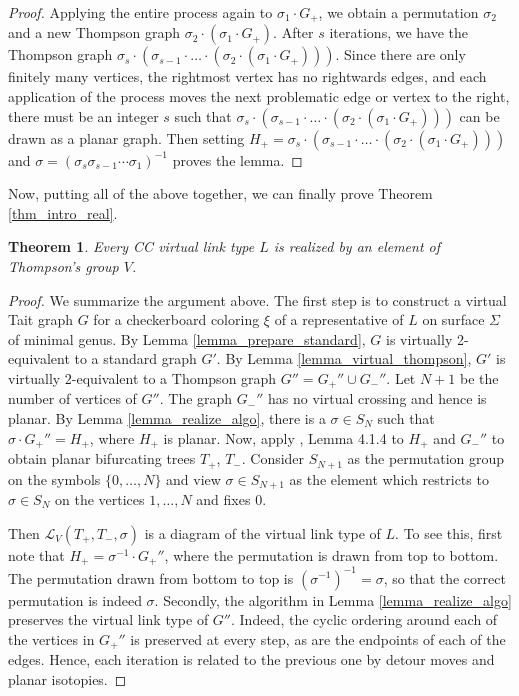 \documentclass[11pt, twoside]{amsart}
\numberwithin{equation}{section}
\newtheorem{theorem}{Theorem}[subsection]
\theoremstyle{definition}
\numberwithin{equation}{section}
\begin{document}
\begin{proof}
Applying the entire process again to $\sigma_1 \cdot G_+$, we obtain a permutation $\sigma_2$ and a new Thompson graph $\sigma_2 \cdot (\sigma_1 \cdot G_+)$. After $s$ iterations, we have the Thompson graph $\sigma_s \cdot (\sigma_{s-1} \cdot \ldots\cdot(\sigma_2 \cdot (\sigma_1 \cdot G_+)))$. Since there are only finitely many vertices, the rightmost vertex has no rightwards edges, and each application of the process moves the next problematic edge or vertex to the right, there must be an integer $s$ such that $\sigma_s \cdot (\sigma_{s-1} \cdot \ldots\cdot(\sigma_2 \cdot (\sigma_1 \cdot G_+)))$ can be drawn as a planar graph. Then setting $H_+=\sigma_s \cdot (\sigma_{s-1} \cdot \ldots\cdot(\sigma_2 \cdot (\sigma_1 \cdot G_+)))$ and $\sigma= (\sigma_s\sigma_{s-1} \cdots \sigma_1)^{-1}$ proves the lemma.
\end{proof}

Now, putting all of the above together, we can finally prove Theorem \ref{thm_intro_real}.

\begin{theorem}\label{thm: realization} Every CC virtual link type $L$ is realized by an element of Thompson's group $V$.
\end{theorem}
\begin{proof} We summarize the argument above. The first step is to construct a virtual Tait graph $G$ for a checkerboard coloring $\xi$ of a representative of $L$ on surface $\Sigma$ of minimal genus. By Lemma \ref{lemma_prepare_standard}, $G$ is virtually 2-equivalent to a standard graph $G'$. By Lemma \ref{lemma_virtual_thompson}, $G'$ is virtually $2$-equivalent to a Thompson graph $G''=G_+'' \cup G_-''$. Let $N+1$ be the number of vertices of $G''$. The graph $G_-''$ has no virtual crossing and hence is planar. By Lemma \ref{lemma_realize_algo}, there is a $\sigma \in S_N$ such that $\sigma \cdot G_+''= H_+$, where $H_+$ is planar. Now, apply \cite{jones_unitary}, Lemma 4.1.4 to $H_+$ and $G_-''$ to obtain planar bifurcating trees $T_+$, $T_-$. Consider $S_{N+1}$ as the permutation group on the symbols $\{0,\ldots,N\}$ and view $\sigma \in S_{N+1}$ as the element which restricts to $\sigma \in S_{N}$ on the vertices $1,\ldots,N$ and fixes $0$. 

Then $\mathscr{L}_V(T_+,T_-,\sigma)$ is a diagram of the virtual link type of $L$. To see this, first note that $H_+=\sigma^{-1} \cdot G_+''$, where the permutation is drawn from top to bottom. The permutation drawn from bottom to top is $(\sigma^{-1})^{-1}=\sigma$, so that the correct permutation is indeed $\sigma$. Secondly, the algorithm in Lemma \ref{lemma_realize_algo} preserves the virtual link type of $G''$. Indeed, the cyclic ordering around each of the vertices in $G_+''$ is preserved at every step, as are the endpoints of each of the edges. Hence, each iteration is related to the previous one by detour moves and planar isotopies.  
\end{proof}
\end{document}
